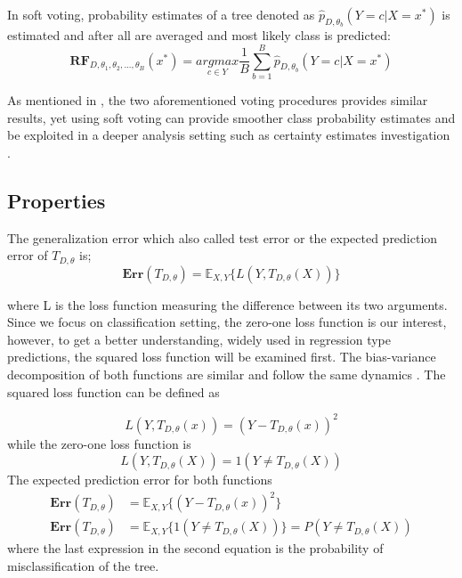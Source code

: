 In soft voting, probability estimates of a tree denoted as $\hat{p}_{D, \theta_{b}} (Y = c | X = x^*)$ is estimated and after all are averaged and most likely class is predicted:
\begin{equation}
\boldsymbol{RF}_{D, \theta_{1}, \theta_{2}, ..., \theta_{B}} (x^*) =
	\underset{c \in Y}{argmax} \dfrac{1}{B}\sum_{b = 1}^{B}{\hat{p}_{D, \theta_{b}} (Y = c | X = x^*)}
\end{equation}


As mentioned in \cite{Breiman1996OUT-OF-BAG-E}, the two aforementioned voting procedures provides similar results,
 yet using soft voting can provide smoother class probability estimates and be exploited in a deeper analysis setting such as 
 certainty estimates investigation \cite{louppe2014understanding}. 

\subsection{Properties}
The generalization error which also called test error or the expected prediction error of $T_{D,\theta}$ is;
\begin{equation}
	\boldsymbol{Err}(T_{D,\theta}) = \mathbb{E}_{X,Y}\{L(Y, T_{D,\theta}(X)) \}
\end{equation}

where L is the loss function measuring the difference between its two arguments. Since we focus on classification setting, 
the zero-one loss function is our interest, however, to get a better understanding, widely used in regression type predictions, 
the squared loss function will be examined first. The bias-variance decomposition of both functions are similar and 
follow the same dynamics \cite{domingos2000decomposition}. The squared loss function can be defined as

\begin{equation}
L(Y, T_{D, \theta}(x)) = (Y - T_{D, \theta}(x))^2
\end{equation}
while the zero-one loss function is
\begin{equation}
L(Y, T_{D,\theta}(X)) = 1 (Y \neq T_{D, \theta}(X))
\end{equation}
The expected prediction error for both functions 
\begin{align}
\boldsymbol{Err}(T_{D,\theta}) & = \mathbb{E}_{X,Y}\{ (Y - T_{D, \theta}(x))^2 \} \\
\boldsymbol{Err}(T_{D,\theta}) & = \mathbb{E}_{X,Y}\{ 1(Y \neq T_{D, \theta}(X)) \}
= P(Y \neq T_{D, \theta}(X))
\end{align}
where the last expression in the second equation is the probability of misclassification of the tree.


